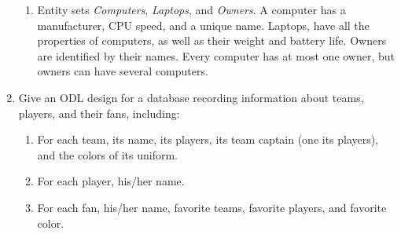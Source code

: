 \documentclass[12pt]{article}
\begin{document}
\begin{enumerate}
\begin{enumerate}
    \item Entity sets {\em Computers}, {\em Laptops}, and {\em Owners}.
	A computer has a manufacturer, CPU speed, and a unique name.
	Laptops, have all the properties of computers, as well as their
	weight and battery life.  Owners are identified by their names.
	Every computer has at most one owner, but owners can have 
	several computers.
\end{enumerate}

\item Give an ODL design for a database recording information about teams,
players, and their fans, including:
\begin{enumerate}
    \item For each team, its name, its players, its team captain (one its
	players), and the colors of its uniform.
    \item For each player, his/her name.
    \item For each fan, his/her name, favorite teams, favorite players,
	and favorite color.
\end{enumerate}


\end{enumerate}
\end{document}
